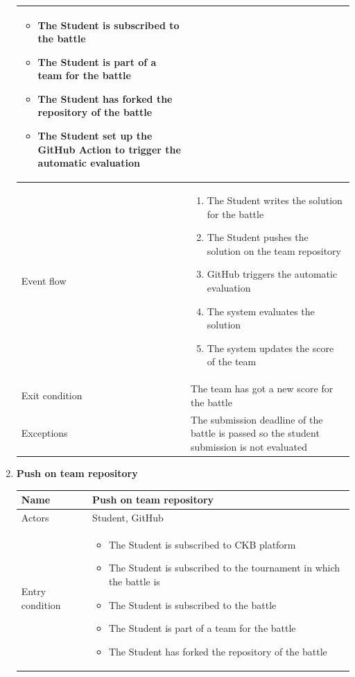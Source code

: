\begin{enumerate}[label=UC\arabic*:]
\begin{tabular}{|p{3cm}|p{8cm}|}
\begin{itemize}
            \item The Student is subscribed to the battle
            \item The Student is part of a team for the battle
            \item The Student has forked the repository of the battle
            \item The Student set up the GitHub Action to trigger the automatic evaluation
        \end{itemize} \\
        \hline
        Event flow &
        \begin{enumerate}[label=\arabic*.]
            \item The Student writes the solution for the battle
            \item The Student pushes the solution on the team repository
            \item GitHub triggers the automatic evaluation
            \item The system evaluates the solution
            \item The system updates the score of the team
        \end{enumerate} \\
        \hline
        Exit condition & The team has got a new score for the battle \\
        \hline
        Exceptions & The submission deadline of the battle is passed so the student submission is not evaluated \\
        \hline
    \end{tabular}
    \item \textbf{Push on team repository} \\
    \begin{tabular}{|p{3cm}|p{8cm}|}
        \hline
        Name & Push on team repository \\
        \hline
        Actors & Student, GitHub \\
        \hline
        Entry condition &
        \begin{itemize}
            \item The Student is subscribed to CKB platform
            \item The Student is subscribed to the tournament in which the battle is
            \item The Student is subscribed to the battle
            \item The Student is part of a team for the battle
            \item The Student has forked the repository of the battle

\end{itemize}
\end{tabular}
\end{enumerate}
